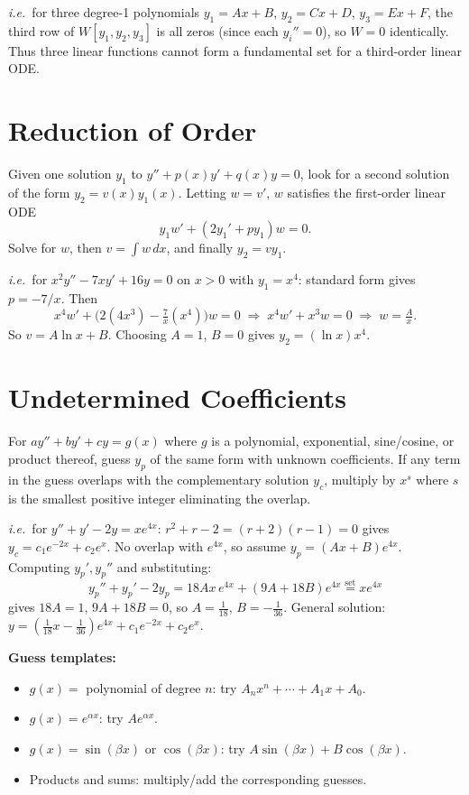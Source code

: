 \documentclass[11pt]{article}
\begin{document}
\textit{i.e.}\ for three degree-1 polynomials $y_1 = Ax + B$, $y_2 = Cx + D$, $y_3 = Ex + F$, the third row of $W[y_1,y_2,y_3]$ is all zeros (since each $y_i'' = 0$), so $W = 0$ identically. Thus three linear functions cannot form a fundamental set for a third-order linear ODE.
 
\section*{Reduction of Order}
Given one solution $y_1$ to $y'' + p(x)y' + q(x)y = 0$, look for a second solution of the form $y_2 = v(x)y_1(x)$. Letting $w = v'$, $w$ satisfies the first-order linear ODE
\[
y_1 w' + (2y_1' + p y_1)w = 0.
\]
Solve for $w$, then $v = \int w\,dx$, and finally $y_2 = v y_1$.
 
\textit{i.e.}\ for $x^2 y'' - 7xy' + 16y = 0$ on $x > 0$ with $y_1 = x^4$: standard form gives $p = -7/x$. Then
\[
x^4 w' + \bigl(2(4x^3) - \tfrac{7}{x}(x^4)\bigr)w = 0 \;\Rightarrow\; x^4 w' + x^3 w = 0 \;\Rightarrow\; w = \tfrac{A}{x}.
\]
So $v = A\ln x + B$. Choosing $A = 1$, $B = 0$ gives $y_2 = (\ln x)x^4$.
 
\section*{Undetermined Coefficients}
For $ay'' + by' + cy = g(x)$ where $g$ is a polynomial, exponential, sine/cosine, or product thereof, guess $y_p$ of the same form with unknown coefficients. If any term in the guess overlaps with the complementary solution $y_c$, multiply by $x^s$ where $s$ is the smallest positive integer eliminating the overlap.
 
\textit{i.e.}\ for $y'' + y' - 2y = xe^{4x}$: $r^2 + r - 2 = (r+2)(r-1) = 0$ gives $y_c = c_1 e^{-2x} + c_2 e^x$. No overlap with $e^{4x}$, so assume $y_p = (Ax + B)e^{4x}$. Computing $y_p', y_p''$ and substituting:
\[
y_p'' + y_p' - 2y_p = 18Ax\,e^{4x} + (9A + 18B)e^{4x} \stackrel{\text{set}}{=} xe^{4x}
\]
gives $18A = 1$, $9A + 18B = 0$, so $A = \tfrac{1}{18}$, $B = -\tfrac{1}{36}$. General solution: $y = (\tfrac{1}{18}x - \tfrac{1}{36})e^{4x} + c_1 e^{-2x} + c_2 e^x$.
 
\textbf{Guess templates:}
\begin{itemize}[leftmargin=*]
    \item $g(x) = $ polynomial of degree $n$: try $A_n x^n + \cdots + A_1 x + A_0$.
    \item $g(x) = e^{\alpha x}$: try $A e^{\alpha x}$.
    \item $g(x) = \sin(\beta x)$ or $\cos(\beta x)$: try $A\sin(\beta x) + B\cos(\beta x)$.
    \item Products and sums: multiply/add the corresponding guesses.
\end{itemize}
 
\end{document}
